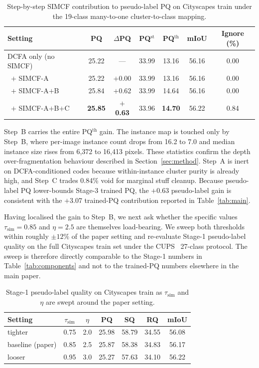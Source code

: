 \documentclass{article}
\begin{document}
\begin{table}[!htbp]
\caption{Step-by-step SIMCF contribution to pseudo-label PQ on Cityscapes train under the 19-class many-to-one cluster-to-class mapping.}
\label{tab:simcf_step_ablation}
\centering
\small
\setlength{\tabcolsep}{6pt}
\begin{tabular}{l c c c c c c}
\toprule
Setting & PQ & $\Delta$PQ & PQ$^\text{st}$ & PQ$^\text{th}$ & mIoU & Ignore (\%) \\
\midrule
DCFA only (no SIMCF)        & 25.22 & ---     & 33.99 & 13.16 & 56.16 & 0.00 \\
\, $+$ SIMCF-A              & 25.22 & $+$0.00 & 33.99 & 13.16 & 56.16 & 0.00 \\
\, $+$ SIMCF-A$+$B          & 25.84 & $+$0.62 & 33.99 & 14.64 & 56.16 & 0.00 \\
\, $+$ SIMCF-A$+$B$+$C      & \textbf{25.85} & \textbf{$+$0.63} & 33.96 & \textbf{14.70} & 56.22 & 0.84 \\
\bottomrule
\end{tabular}
\end{table}

Step~B carries the entire PQ$^\text{th}$ gain. The instance map is touched only by Step~B, where per-image instance count drops from 16.2 to 7.0 and median instance size rises from 6{,}372 to 16{,}413 pixels. These statistics confirm the depth over-fragmentation behaviour described in Section~\ref{sec:method}. Step~A is inert on DCFA-conditioned codes because within-instance cluster purity is already high, and Step~C trades 0.84\% void for marginal stuff cleanup. Because pseudo-label PQ lower-bounds Stage-3 trained PQ, the $+0.63$ pseudo-label gain is consistent with the $+3.07$ trained-PQ contribution reported in Table~\ref{tab:main}.

Having localised the gain to Step~B, we next ask whether the specific values $\tau_\text{sim}{=}0.85$ and $\eta{=}2.5$ are themselves load-bearing. We sweep both thresholds within roughly $\pm 12\%$ of the paper setting and re-evaluate Stage-1 pseudo-label quality on the full Cityscapes train set under the CUPS~\cite{hahn2025cups} 27-class protocol. The sweep is therefore directly comparable to the Stage-1 numbers in Table~\ref{tab:components} and not to the trained-PQ numbers elsewhere in the main paper.

\begin{table}[!htbp]
\caption{Stage-1 pseudo-label quality on Cityscapes train as $\tau_\text{sim}$ and $\eta$ are swept around the paper setting.}
\label{tab:simcf_sensitivity}
\centering
\small
\setlength{\tabcolsep}{6pt}
\begin{tabular}{l c c c c c c}
\toprule
Setting & $\tau_\text{sim}$ & $\eta$ & PQ & SQ & RQ & mIoU \\
\midrule
tighter           & 0.75 & 2.0 & 25.98 & 58.79 & 34.55 & 56.08 \\
baseline (paper)  & 0.85 & 2.5 & 25.87 & 58.38 & 34.83 & 56.17 \\
looser            & 0.95 & 3.0 & 25.27 & 57.63 & 34.10 & 56.22 \\
\bottomrule
\end{tabular}
\end{table}
\end{document}
